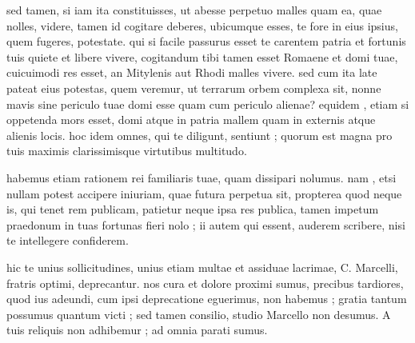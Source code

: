  sed tamen, si iam ita constituisses, ut abesse perpetuo malles quam ea, quae nolles, videre, tamen id cogitare deberes, ubicumque esses, te fore in eius ipsius, quem fugeres, potestate. qui si facile passurus esset te carentem patria et fortunis tuis quiete et libere vivere, cogitandum tibi tamen esset Romaene et domi tuae, cuicuimodi res esset, an Mitylenis aut Rhodi malles vivere. sed cum ita late pateat eius potestas, quem veremur, ut terrarum orbem complexa sit, nonne mavis sine periculo tuae domi esse quam cum periculo alienae? equidem , etiam si oppetenda mors esset, domi atque in patria mallem quam in externis atque alienis locis. hoc idem omnes, qui te diligunt, sentiunt ; quorum est magna pro tuis maximis clarissimisque virtutibus multitudo.

 habemus etiam rationem rei familiaris tuae, quam dissipari nolumus. nam , etsi nullam potest accipere iniuriam, quae futura perpetua sit, propterea quod neque is, qui tenet rem publicam, patietur neque ipsa res publica, tamen impetum praedonum in tuas fortunas fieri nolo ; ii autem qui essent, auderem scribere, nisi te intellegere confiderem.

 hic te unius sollicitudines, unius etiam multae et assiduae lacrimae, C. Marcelli, fratris optimi, deprecantur. nos cura et dolore proximi sumus, precibus tardiores, quod ius adeundi, cum ipsi deprecatione eguerimus, non habemus ; gratia tantum possumus quantum victi ; sed tamen consilio, studio Marcello non desumus. A tuis reliquis non adhibemur ; ad omnia parati sumus.
